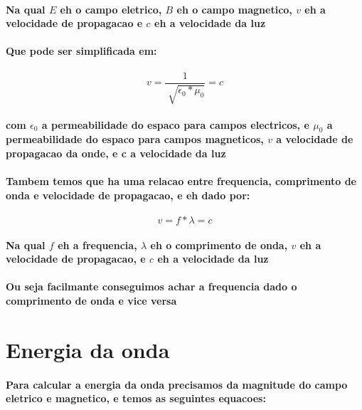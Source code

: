 \documentclass[12pt,twoside, a4paper, twocolumn]{article}
\begin{document}
\paragraph*{Na qual $E$ eh o campo eletrico, $B$ eh o campo magnetico, $v$ eh a velocidade de propagacao e $c$ eh a velocidade da luz}
\paragraph*{Que pode ser simplificada em:}
\begin{equation}
    v = \frac{1}{\sqrt[]{\epsilon_0 * \mu_0}} = c
\end{equation}
\paragraph*{com $\epsilon_0$ a permeabilidade do espaco para campos electricos, e $\mu_0$ a permeabilidade do espaco para campos magneticos, $v$ a velocidade de propagacao da onde, e c a velocidade da luz}

\paragraph*{Tambem temos que ha uma relacao entre frequencia, comprimento de onda e velocidade de propagacao, e eh dado por:}

\begin{equation}
    v = f * \lambda = c
\end{equation}

\paragraph*{Na qual $f$ eh a frequencia, $\lambda$ eh o comprimento de onda, $v$ eh a velocidade de propagacao, e $c$ eh a velocidade da luz}
\paragraph*{Ou seja facilmante conseguimos achar a frequencia dado o comprimento de onda e vice versa}

\section{Energia da onda}
\paragraph*{Para calcular a energia da onda precisamos da magnitude do campo eletrico e magnetico, e temos as seguintes equacoes:}
\end{document}
